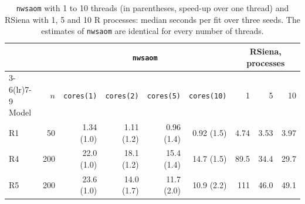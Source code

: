 \begin{table}[htbp]
\centering
\caption{\texttt{nwsaom} with 1 to 10 threads (in parentheses, speed-up over one thread) and RSiena with 1, 5 and 10 R processes: median seconds per fit over three seeds. The estimates of \texttt{nwsaom} are identical for every number of threads.}
\label{tab:cores}
\footnotesize
\begin{tabular}{lrrrrrrrr}
\toprule
 & & \multicolumn{4}{c}{\texttt{nwsaom}} & \multicolumn{3}{c}{RSiena, processes} \\
\cmidrule(lr){3-6}\cmidrule(lr){7-9}
Model & $n$ & \texttt{cores(1)} & \texttt{cores(2)} & \texttt{cores(5)} & \texttt{cores(10)} & 1 & 5 & 10 \\
\midrule
R1 & 50 & 1.34 (1.0) & 1.11 (1.2) & 0.96 (1.4) & 0.92 (1.5) & 4.74 & 3.53 & 3.97 \\
R4 & 200 & 22.0 (1.0) & 18.1 (1.2) & 15.4 (1.4) & 14.7 (1.5) & 89.5 & 34.4 & 29.7 \\
R5 & 200 & 23.6 (1.0) & 14.0 (1.7) & 11.7 (2.0) & 10.9 (2.2) & 111 & 46.0 & 49.1 \\
\bottomrule
\end{tabular}
\end{table}
